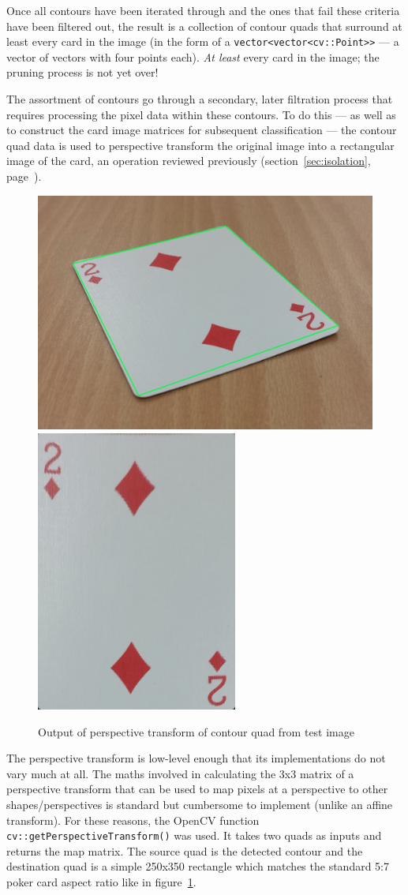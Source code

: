 \documentclass[a4paper,12pt,notitlepage]{article}
\newcommand{\secref}[1]{(section~\ref{#1}, page~\pageref{#1})}
\newcommand{\code}[1]{\lstinline[basicstyle=\ttfamily,breakautoindent=false,postbreak={}]|#1|}
\begin{document}
			Once all contours have been iterated through and the ones that fail these criteria have been filtered out, the result is a collection of contour quads that surround at least every card in the image (in the form of a \code{vector<vector<cv::Point>>} --- a vector of vectors with four points each). \emph{At least} every card in the image; the pruning process is not yet over!

			The assortment of contours go through a secondary, later filtration process that requires processing the pixel data within these contours. To do this --- as well as to construct the card image matrices for subsequent classification --- the contour quad data is used to perspective transform the original image into a rectangular image of the card, an operation reviewed previously \secref{sec:isolation}.

			\begin{figure}[H]
				\centering
				\includegraphics[width=0.6\linewidth]{perstrans1}
				\includegraphics[width=0.3\linewidth]{perstrans2}
				\caption{Output of perspective transform of contour quad from test image}
				\label{fig:perstrans}
			\end{figure}

			The perspective transform is low-level enough that its implementations do not vary much at all. The maths involved in calculating the 3x3 matrix of a perspective transform that can be used to map pixels at a perspective to other shapes/perspectives is standard but cumbersome to implement (unlike an affine transform). For these reasons, the OpenCV function \code{cv::getPerspectiveTransform()} was used. It takes two quads as inputs and returns the map matrix. The source quad is the detected contour and the destination quad is a simple 250x350 rectangle which matches the standard 5:7 poker card aspect ratio like in figure~\ref{fig:perstrans}.
\end{document}
